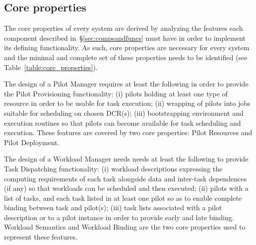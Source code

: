 \documentclass{sig-alternate}
\begin{document}

%
\subsection{Core properties}
\label{sec:coreprops}

The core properties of every \pilot system are derived by analyzing the features
each component described in~\S\ref{sec:compsandfuncs} must have in order to
implement its defining functionality. As such, core properties are necessary for
every \pilot system and the minimal and complete set of these properties needs
to be identified (see Table~\ref{table:core_properties}).

The design of a Pilot Manager requires at least the following in order to
provide the Pilot Provisioning functionality: (i) pilots holding at least one
type of resource in order to be usable for task execution; (ii) wrapping of
pilots into jobs suitable for scheduling on chosen DCR(s); (iii) bootstrapping
environment and execution routines so that pilots can become available for task
scheduling and execution. These features are covered by two core properties:
Pilot Resources and Pilot Deployment.

The design of a Workload Manager needs needs at least the following to provide
Task Dispatching functionality: (i) workload descriptions expressing the
computing requirements of each task alongside data and inter-task dependences
(if any) so that workloads can be scheduled and then executed; (ii) pilots with
a list of tasks, and each task listed in at least one pilot so as to enable
complete binding between task and pilot(s); (iii) task lists associated with a
pilot description or to a pilot instance in order to provide early and late
binding. Workload Semantics and Workload Binding are the two core properties
used to represent these features.
\end{document}
